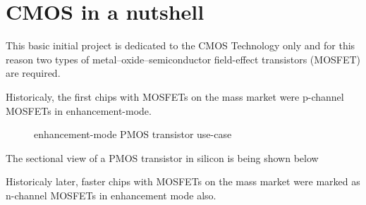 \section{CMOS in a nutshell}

This basic initial project is dedicated to the CMOS Technology only and for this reason two types of metal–oxide–semiconductor field-effect transistors (MOSFET) are required.

Historicaly, the first chips with MOSFETs on the mass market were p-channel MOSFETs in enhancement-mode.

\begin{center}
    \begin{figure}[h] \caption{enhancement-mode PMOS transistor use-case}
        \begin{circuitdiagram}{20}{20}
        \end{circuitdiagram}
    \end{figure}
\end{center}

The sectional view of a PMOS transistor in silicon is being shown below

Historicaly later, faster chips with MOSFETs on the mass market were marked as n-channel MOSFETs in enhancement mode also.

